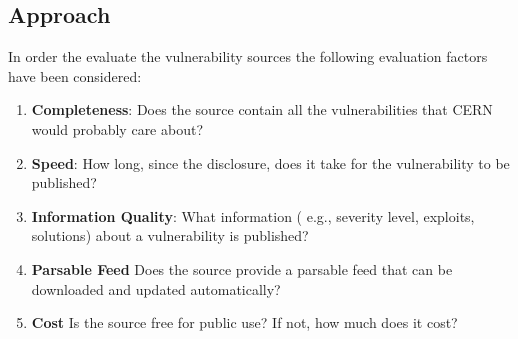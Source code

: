 \subsection{Approach}
In order the evaluate the vulnerability sources the following evaluation factors have been considered:
\begin{enumerate}
\item \textbf{Completeness}: Does the source contain all the vulnerabilities that CERN would probably care about? 
\item \textbf{Speed}: How long, since the disclosure, does it take for the vulnerability to be published?
\item \textbf{Information Quality}: What information ( e.g., severity level, exploits, solutions) about a vulnerability is published?
\item \textbf{Parsable Feed} Does the source provide a parsable feed that can be downloaded and updated automatically?
\item \textbf{Cost} Is the source free for public use? If not, how much does it cost?
\end{enumerate} 

